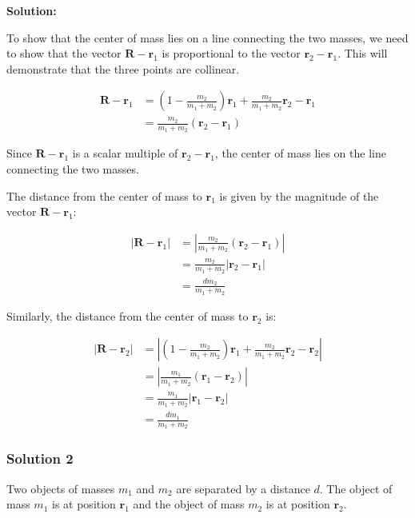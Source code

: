 \documentclass{article}
\begin{document}
\textbf{Solution:}

To show that the center of mass lies on a line connecting the two masses, we need to show that the vector $\mathbf{R} - \mathbf{r}_1$ is proportional to the vector $\mathbf{r}_2 - \mathbf{r}_1$.  This will demonstrate that the three points are collinear.

\begin{align*}
\mathbf{R} - \mathbf{r}_1 &= \left( 1 - \frac{m_2}{m_1 + m_2} \right) \mathbf{r}_1 + \frac{m_2}{m_1 + m_2} \mathbf{r}_2 - \mathbf{r}_1 \\
&= \frac{m_2}{m_1 + m_2} (\mathbf{r}_2 - \mathbf{r}_1)
\end{align*}

Since $\mathbf{R} - \mathbf{r}_1$ is a scalar multiple of $\mathbf{r}_2 - \mathbf{r}_1$, the center of mass lies on the line connecting the two masses.

The distance from the center of mass to $\mathbf{r}_1$ is given by the magnitude of the vector $\mathbf{R} - \mathbf{r}_1$:

\begin{align*}
|\mathbf{R} - \mathbf{r}_1| &= \left| \frac{m_2}{m_1 + m_2} (\mathbf{r}_2 - \mathbf{r}_1) \right| \\
&= \frac{m_2}{m_1 + m_2} |\mathbf{r}_2 - \mathbf{r}_1| \\
&= \frac{dm_2}{m_1 + m_2}
\end{align*}

Similarly, the distance from the center of mass to $\mathbf{r}_2$ is:

\begin{align*}
|\mathbf{R} - \mathbf{r}_2| &= \left| \left( 1 - \frac{m_2}{m_1 + m_2} \right) \mathbf{r}_1 + \frac{m_2}{m_1 + m_2} \mathbf{r}_2 - \mathbf{r}_2 \right| \\
&= \left| \frac{m_1}{m_1 + m_2} (\mathbf{r}_1 - \mathbf{r}_2) \right| \\
&= \frac{m_1}{m_1 + m_2} |\mathbf{r}_1 - \mathbf{r}_2| \\
&= \frac{dm_1}{m_1 + m_2}
\end{align*}

\subsubsection{Solution 2}

Two objects of masses $m_1$ and $m_2$ are separated by a distance $d$. The object of mass $m_1$ is at position $\mathbf{r}_1$ and the object of mass $m_2$ is at position $\mathbf{r}_2$.
\end{document}
